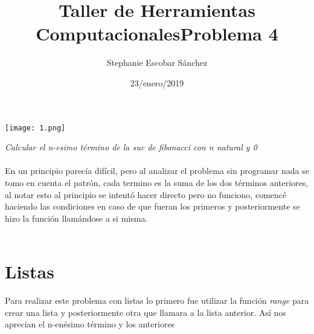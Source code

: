 \documentclass{article}
\title{\Huge Taller de Herramientas Computacionales}
\author{Stephanie Escobar Sánchez}
\date{23/enero/2019}
\begin{document}
	\maketitle
	\begin{center}
		\texttt{[image: 1.png]}	
	\end{center}
	\newpage
	\begin{center}
		\title {\Huge Problema 4} 
	\end{center}

\textit{Calcular el n-esimo término de la suc de fibonacci con n natural y 0}\\
\\
En un principio parecía difícil, pero al analizar el problema sin programar nada se tomo en cuenta el patrón, cada termino es la suma de los dos términos anteriores, al notar esto al principio se intentó hacer directo pero no funciono, comencé haciendo las condiciones en caso de que fueran los primeros y posteriormente se hizo la función llamándose a si misma.\\
\\
\section*{Listas}
Para realizar este problema con listas lo primero fue utilizar la función \textit{range} para crear una lista  y posteriormente otra que llamara a la lista anterior. Así nos aprecian el n-enésimo término y los anteriores
\end{document}
